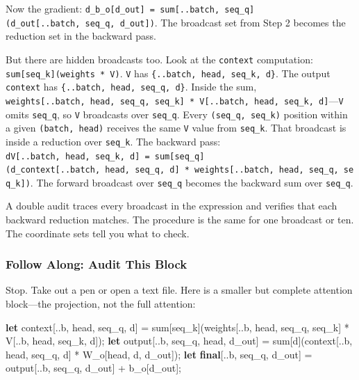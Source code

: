 \documentclass[11pt,titlepage]{article}
\newenvironment{Shaded}{}{}
\newcommand{\KeywordTok}[1]{\textcolor[rgb]{0.00,0.44,0.13}{\textbf{#1}}}
\newcommand{\NormalTok}[1]{#1}
\newcommand{\OperatorTok}[1]{\textcolor[rgb]{0.40,0.40,0.40}{#1}}
\begin{document}
Now the gradient:
\texttt{d\_b\_o{[}d\_out{]}\ =\ sum{[}..batch,\ seq\_q{]}(d\_out{[}..batch,\ seq\_q,\ d\_out{]})}.
The broadcast set from Step 2 becomes the reduction set in the backward
pass.

But there are hidden broadcasts too. Look at the \texttt{context}
computation: \texttt{sum{[}seq\_k{]}(weights\ *\ V)}. \texttt{V} has
\texttt{\{..batch,\ head,\ seq\_k,\ d\}}. The output \texttt{context}
has \texttt{\{..batch,\ head,\ seq\_q,\ d\}}. Inside the sum,
\texttt{weights{[}..batch,\ head,\ seq\_q,\ seq\_k{]}\ *\ V{[}..batch,\ head,\ seq\_k,\ d{]}}---\texttt{V}
omits \texttt{seq\_q}, so \texttt{V} broadcasts over \texttt{seq\_q}.
Every \texttt{(seq\_q,\ seq\_k)} position within a given
\texttt{(batch,\ head)} receives the same \texttt{V} value from
\texttt{seq\_k}. That broadcast is inside a reduction over
\texttt{seq\_k}. The backward pass:
\texttt{dV{[}..batch,\ head,\ seq\_k,\ d{]}\ =\ sum{[}seq\_q{]}(d\_context{[}..batch,\ head,\ seq\_q,\ d{]}\ *\ weights{[}..batch,\ head,\ seq\_q,\ seq\_k{]})}.
The forward broadcast over \texttt{seq\_q} becomes the backward sum over
\texttt{seq\_q}.

A double audit traces every broadcast in the expression and verifies
that each backward reduction matches. The procedure is the same for one
broadcast or ten. The coordinate sets tell you what to check.

\vspace{2em}

\hypertarget{follow-along-audit-this-block}{%
\subsubsection{Follow Along: Audit This
Block}\label{follow-along-audit-this-block}}

Stop. Take out a pen or open a text file. Here is a smaller but complete
attention block---the projection, not the full attention:

\begin{Shaded}
\begin{Highlighting}[]
\KeywordTok{let}\NormalTok{ context}\OperatorTok{[}\NormalTok{..b, head, seq_q, d}\OperatorTok{]}\NormalTok{ =}
\NormalTok{    sum}\OperatorTok{[}\NormalTok{seq_k}\OperatorTok{]}\NormalTok{(weights}\OperatorTok{[}\NormalTok{..b, head, seq_q, seq_k}\OperatorTok{]}\NormalTok{ * V}\OperatorTok{[}\NormalTok{..b, head, seq_k, d}\OperatorTok{]}\NormalTok{);}
\KeywordTok{let}\NormalTok{ output}\OperatorTok{[}\NormalTok{..b, seq_q, head, d_out}\OperatorTok{]}\NormalTok{ =}
\NormalTok{    sum}\OperatorTok{[}\NormalTok{d}\OperatorTok{]}\NormalTok{(context}\OperatorTok{[}\NormalTok{..b, head, seq_q, d}\OperatorTok{]}\NormalTok{ * W_o}\OperatorTok{[}\NormalTok{head, d, d_out}\OperatorTok{]}\NormalTok{);}
\KeywordTok{let} \KeywordTok{final}\OperatorTok{[}\NormalTok{..b, seq_q, d_out}\OperatorTok{]}\NormalTok{ = output}\OperatorTok{[}\NormalTok{..b, seq_q, d_out}\OperatorTok{]}\NormalTok{ + b_o}\OperatorTok{[}\NormalTok{d_out}\OperatorTok{]}\NormalTok{;}
\end{Highlighting}
\end{Shaded}
\end{document}
